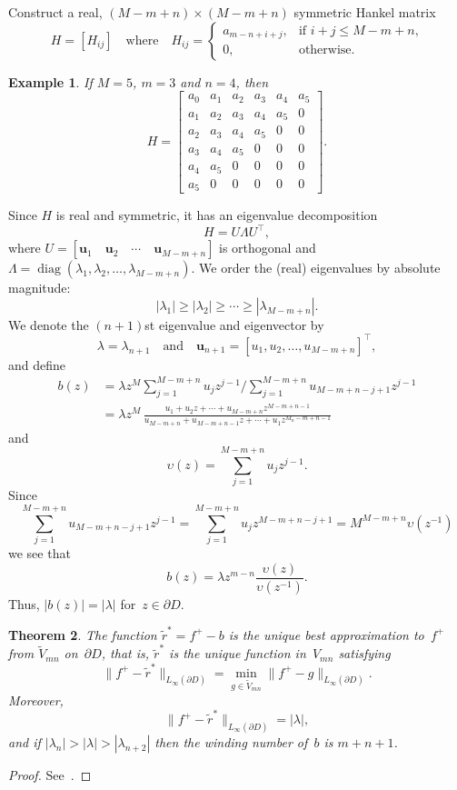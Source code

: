 \documentclass[12pt,a4paper]{article}
\newtheorem{theorem}{Theorem}
\newtheorem{example}[theorem]{Example}
\newcommand{\diag}{\operatorname{diag}}
\begin{document}
Construct a real, $(M-m+n)\times(M-m+n)$ symmetric Hankel matrix
\[
H=[H_{ij}]\quad\text{where}\quad
H_{ij}=\begin{cases}
    a_{m-n+i+j},&\text{if $i+j\le M-m+n$,}\\
    0,&\text{otherwise.}
\end{cases}
\]

\begin{example}
If $M=5$, $m=3$ and $n=4$, then
\[
H=\begin{bmatrix}
a_0&a_1&a_2&a_3&a_4&a_5\\
a_1&a_2&a_3&a_4&a_5&0\\
a_2&a_3&a_4&a_5&0  &0\\
a_3&a_4&a_5&0  &0  &0\\
a_4&a_5&0  &0  &0  &0\\
a_5&0  &0  &0  &0  &0
\end{bmatrix}.
\]
\end{example}

Since $H$ is real and symmetric, it has an eigenvalue decomposition
\[
H=U\Lambda U^\top,
\]
where $U=[\boldsymbol{u}_1\quad\boldsymbol{u}_2\quad\cdots
\quad\boldsymbol{u}_{M-m+n}]$ is orthogonal and 
$\Lambda=\diag(\lambda_1,\lambda_2,\ldots,
\lambda_{M-m+n})$.  We order the (real) eigenvalues by absolute magnitude:
\[
|\lambda_1|\ge|\lambda_2|\ge\cdots\ge|\lambda_{M-m+n}|.
\]
We denote the $(n+1)$st eigenvalue and eigenvector by
\[
\lambda=\lambda_{n+1}\quad\text{and}\quad
\boldsymbol{u}_{n+1}=[u_1,u_2,\ldots,u_{M-m+n}]^\top,
\]
and define
\begin{align*}
b(z)&=\lambda z^M\sum_{j=1}^{M-m+n}u_jz^{j-1}\bigg/
\sum_{j=1}^{M-m+n}u_{M-m+n-j+1}z^{j-1}\\
    &=\lambda z^M\,\frac{u_1+u_2z+\cdots+u_{M-m+n}z^{M-m+n-1}}%
{u_{M-m+n}+u_{M-m+n-1}z+\cdots+u_1z^{M_n-m+n-1}}
\end{align*}
and
\[
\upsilon(z)=\sum_{j=1}^{M-m+n}u_jz^{j-1}.
\]
Since
\[
\sum_{j=1}^{M-m+n}u_{M-m+n-j+1}z^{j-1}=\sum_{j=1}^{M-m+n}u_jz^{M-m+n-j+1}
    =M^{M-m+n}\upsilon(z^{-1})
\]
we see that
\[
b(z)=\lambda z^{m-n}\frac{\upsilon(z)}{\upsilon(z^{-1})}.
\]
Thus, $|b(z)|=|\lambda|$ for~$z\in\partial D$.

\begin{theorem}
The function $\tilde r^*=f^+-b$ is the unique best approximation to~$f^+$
from $\tilde V_{mn}$ on~$\partial D$, that is, $\tilde r^*$ is the unique 
function in~$V_{mn}$ satisfying
\[
\|f^+-\tilde r^*\|_{L_\infty(\partial D)}=\min_{g\in\tilde V_{mn}}
\|f^+-g\|_{L_\infty(\partial D)}.
\]
Moreover, 
\[
\|f^+-\tilde r^*\|_{L_\infty(\partial D)}=|\lambda|,
\]
and if $|\lambda_n|>|\lambda|>|\lambda_{n+2}|$ then the winding number 
of~$b$ is $m+n+1$.  
\end{theorem}
\begin{proof}
See~\cite[Theorem~1]{TrefethenGutknecht1983}.
\end{proof}
\end{document}

